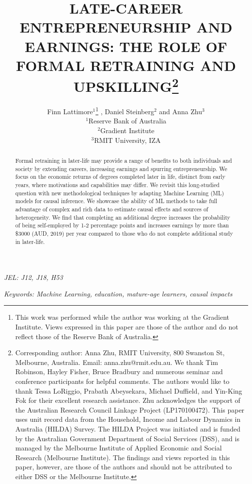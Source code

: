 \documentclass[12pt, a4paper]{article}
\title{LATE-CAREER ENTREPRENEURSHIP AND EARNINGS: THE ROLE OF FORMAL RETRAINING AND UPSKILLING\thanks{\scriptsize{Corresponding author: Anna Zhu, RMIT University, 800 Swanston St, Melbourne, Australia. Email: anna.zhu@rmit.edu.au. \newline We thank Tim Robinson, Hayley Fisher, Bruce Bradbury and numerous seminar and conference participants for helpful comments. The authors would like to thank Tessa LoRiggio, Prabath Abeysekara, Michael Duffield, and Yin-King Fok for their excellent research assistance. \newline Zhu acknowledges the support of the Australian Research Council Linkage Project (LP170100472). This paper uses unit record data from the Household, Income and Labour Dynamics in Australia (HILDA) Survey. The HILDA Project was initiated and is funded by the Australian Government Department of Social Services (DSS), and is managed by the Melbourne Institute of Applied Economic and Social Research (Melbourne Institute). The findings and views reported in this paper, however, are those of the authors and should not be attributed to either DSS or the Melbourne Institute.}}} \vspace{0.2cm} \author{Finn Lattimore$^1$\thanks{\scriptsize{This work was performed while the author was working at the Gradient Institute. Views expressed in this paper are those of the author and do not reflect those of the Reserve Bank of Australia.}}\vspace{0.2cm} ,  Daniel Steinberg$^2$ and Anna Zhu$^3$ \\\small {$^1$Reserve Bank of Australia} \vspace{0.2cm} \\ {$^2$Gradient Institute} \vspace{0.2cm} \\ {$^3$RMIT University, IZA}}
\begin{document}
\maketitle

\begin{abstract}

Formal retraining in later-life may provide a range of benefits to both individuals and society by extending careers, increasing earnings and spurring entrepreneurship. We focus on the economic returns of degrees completed later in life, distinct from early years, where motivations and capabilities may differ. We revisit this long-studied question with new methodological techniques by adapting Machine Learning (ML) models for causal inference. We showcase the ability of ML methods to take full advantage of complex and rich data to estimate causal effects and sources of heterogeneity. We find that completing an additional degree increases the probability of being self-employed by 1-2 percentage points and increases earnings by more than \$3000 (AUD, 2019) per year compared to those who do not complete additional study in later-life. 

\end{abstract}

\emph{JEL: J12, J18, H53}

\emph{Keywords: Machine Learning, education, mature-age learners, causal impacts}
\end{document}
